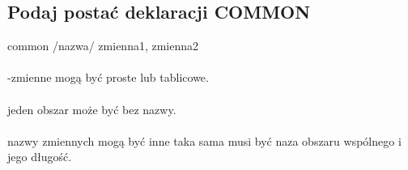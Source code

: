 \subsection{Podaj postać deklaracji COMMON}
common /nazwa/ zmienna1, zmienna2
\\
\\
-zmienne mogą być proste lub tablicowe.
\\
\\
jeden obszar może być bez nazwy.
\\
\\
nazwy zmiennych mogą być inne taka sama musi być naza obszaru wspólnego i jego długość.